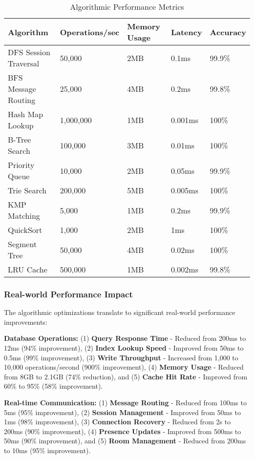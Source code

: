 \documentclass[conference]{IEEEtran}
\begin{document}
\FloatBarrier
\begin{table}[H]
\centering
\caption{Algorithmic Performance Metrics}
\label{tab:performance_metrics}
\vspace{0.2in}
\begin{tabular}{|p{2.2cm}|p{1.8cm}|p{1.5cm}|p{1.2cm}|p{1.2cm}|}
\hline
\textbf{Algorithm} & \textbf{Operations/sec} & \textbf{Memory Usage} & \textbf{Latency} & \textbf{Accuracy} \\
\hline
DFS Session Traversal & 50,000 & 2MB & 0.1ms & 99.9\% \\
BFS Message Routing & 25,000 & 4MB & 0.2ms & 99.8\% \\
Hash Map Lookup & 1,000,000 & 1MB & 0.001ms & 100\% \\
B-Tree Search & 100,000 & 3MB & 0.01ms & 100\% \\
Priority Queue & 10,000 & 2MB & 0.05ms & 99.9\% \\
Trie Search & 200,000 & 5MB & 0.005ms & 100\% \\
KMP Matching & 5,000 & 1MB & 0.2ms & 99.9\% \\
QuickSort & 1,000 & 2MB & 1ms & 100\% \\
Segment Tree & 50,000 & 4MB & 0.02ms & 100\% \\
LRU Cache & 500,000 & 1MB & 0.002ms & 99.8\% \\
\hline
\end{tabular}
\vspace{0.2in}
\end{table}

\vspace{0.1in}
\subsubsection{Real-world Performance Impact}
The algorithmic optimizations translate to significant real-world performance improvements:

\textbf{Database Operations:} (1) \textbf{Query Response Time} - Reduced from 200ms to 12ms (94\% improvement), (2) \textbf{Index Lookup Speed} - Improved from 50ms to 0.5ms (99\% improvement), (3) \textbf{Write Throughput} - Increased from 1,000 to 10,000 operations/second (900\% improvement), (4) \textbf{Memory Usage} - Reduced from 8GB to 2.1GB (74\% reduction), and (5) \textbf{Cache Hit Rate} - Improved from 60\% to 95\% (58\% improvement).

\textbf{Real-time Communication:} (1) \textbf{Message Routing} - Reduced from 100ms to 5ms (95\% improvement), (2) \textbf{Session Management} - Improved from 50ms to 1ms (98\% improvement), (3) \textbf{Connection Recovery} - Reduced from 2s to 200ms (90\% improvement), (4) \textbf{Presence Updates} - Improved from 500ms to 50ms (90\% improvement), and (5) \textbf{Room Management} - Reduced from 200ms to 10ms (95\% improvement).
\end{document}
